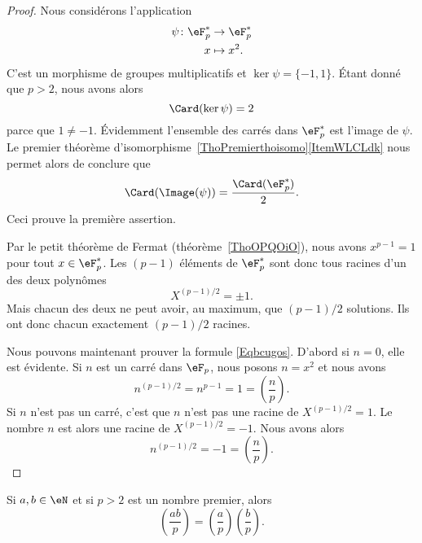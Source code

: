 \begin{proof}
    Nous considérons l'application
    \begin{equation}
        \begin{aligned}
            \psi\colon \eF^*_p&\to \eF^*_p \\
            x&\mapsto x^2.
        \end{aligned}
    \end{equation}
    C'est un morphisme de groupes multiplicatifs et \( \ker\psi=\{ -1,1 \}\). Étant donné que \( p>2\), nous avons alors
    \begin{equation}
        \Card(\ker\psi)=2
    \end{equation}
    parce que \( 1\neq -1\). Évidemment l'ensemble des carrés dans \( \eF^*_p\) est l'image de \( \psi\). Le premier théorème d'isomorphisme~\ref{ThoPremierthoisomo}\ref{ItemWLCLdk} nous permet alors de conclure que
    \begin{equation}
        \Card(\Image(\psi))=\frac{ \Card(\eF^*_p) }{2}.
    \end{equation}
    Ceci prouve la première assertion.

    Par le petit théorème de Fermat (théorème~\ref{ThoOPQOiO}), nous avons \( x^{p-1}=1\) pour tout \( x\in \eF^*_p\). Les \( (p-1)\) éléments de \( \eF^*_p\) sont donc tous racines d'un des deux polynômes
    \begin{equation}
        X^{(p-1)/2}=\pm 1.
    \end{equation}
    Mais chacun des deux ne peut avoir, au maximum, que \( (p-1)/2\) solutions. Ils ont donc chacun exactement \( (p-1)/2\) racines.

    Nous pouvons maintenant prouver la formule \eqref{Eqbcugos}. D'abord si \( n=0\), elle est évidente. Si \( n\) est un carré dans \( \eF_p\), nous posons \( n=x^2\) et nous avons
    \begin{equation}
        n^{(p-1)/2}=n^{p-1}=1=\left(\frac{n}{p}\right).
    \end{equation}
    Si \( n\) n'est pas un carré, c'est que \( n\) n'est pas une racine de \( X^{(p-1)/2}=1\). Le nombre \( n\) est alors une racine de \( X^{(p-1)/2}=-1\). Nous avons alors
    \begin{equation}
        n^{(p-1)/2}=-1=\left(\frac{n}{p}\right).
    \end{equation}
\end{proof}

\begin{corollary}   \label{CoruJosNz}
    Si \( a,b\in \eN\) et si \( p>2\) est un nombre premier, alors
    \begin{equation}
        \left(\frac{ab}{p}\right)=\left(\frac{a}{p}\right)\left(\frac{b}{p}\right).
    \end{equation}
\end{corollary}

